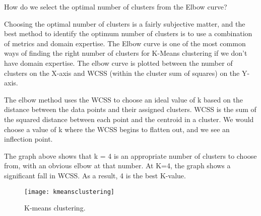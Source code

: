 	\begin{qanda}
		\begin{question}
How do we select the optimal number of clusters from the Elbow curve?
		\end{question}

		\begin{answer}
Choosing the optimal number of clusters is a fairly subjective matter, and the best method to identify the optimum number of clusters is to use a combination of metrics and domain expertise. The Elbow curve is one of the most common ways of finding the right number of clusters for K-Means clustering if we don't have domain expertise. The elbow curve is plotted between the number of clusters on the X-axis and WCSS (within the cluster sum of squares) on the Y-axis.

The elbow method uses the WCSS to choose an ideal value of k based on the distance between the data points and their assigned clusters. WCSS is the sum of the squared distance between each point and the centroid in a cluster. We would choose a value of k where the WCSS begins to flatten out, and we see an inflection point.

The graph above shows that k = 4 is an appropriate number of clusters to choose from, with an obvious elbow at that number. At K=4, the graph shows a significant fall in WCSS. As a result, 4 is the best K-value.
		\end{answer}
	\end{qanda}

	\begin{figure}[h]
		\centering
		\texttt{[image: kmeansclustering]}
		\caption{K-means clustering.}
		\label{fig:kmeansclustering}
	\end{figure}


